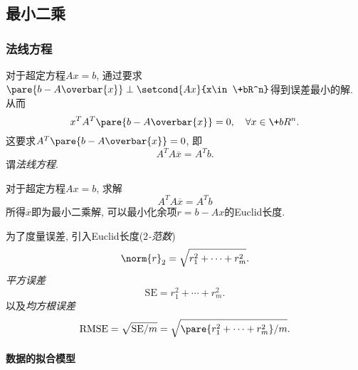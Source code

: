 \documentclass[20pt]{extarticle}
\begin{document}


\subsection{最小二乘} %
\label{sub:最小二乘}

\subsubsection{法线方程} %
\label{ssub:法线方程}

对于超定方程$Ax = b$, 通过要求$\pare{b-A\overbar{x}}\perp \setcond{Ax}{x\in \+bR^n}$得到误差最小的解. 从而
\[ x^T A^T \pare{b-A\overbar{x}} = 0,\quad \forall x\in\+bR^n. \]
这要求$A^T\pare{b-A\overbar{x}} = 0$, 即
\[ A^TA\overbar{x} = A^T b. \]
谓\emph{法线方程}.
\begin{theorem}[最小二乘的法线方程]
    对于超定方程$Ax=b$, 求解
    \[ A^T A\overbar{x} = A^T b \]
    所得$\overbar{x}$即为最小二乘解, 可以最小化余项$r=b-Ax$的Euclid长度.
\end{theorem}
为了度量误差, 引入Euclid长度(\emph{$2$-范数})
\[ \norm{r}_2 = \sqrt{r_1^2+\cdots+r_m^2}. \]
\emph{平方误差}
\[ \mathrm{SE} = r_1^2 + \cdots + r_m^2. \]
以及\emph{均方根误差}
\[ \mathrm{RMSE} = \sqrt{\mathrm{SE}/m} = \sqrt{\pare{r_1^2 + \cdots + r_m^2}/m}. \]

\paragraph{数据的拟合模型} %
\label{par:数据的拟合模型}
\end{document}
